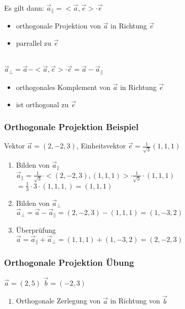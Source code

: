 \begin{frame}
    \vfill Es gilt dann:
    \vfill $\vec{a}_{\parallel} = < \vec{a}, \vec{e}> \cdot \vec{e}$ \\
    \begin{itemize}
        \item orthogonale Projektion von $\vec{a}$ in Richtung $\vec{e}$
        \item parrallel zu $\vec{e}$
    \end{itemize}
    \\
    \vfill$\vec{a}_{\perp} = \vec{a} - <\vec{a}, \vec{e}> \cdot \vec{e} = \vec{a} - \vec{a}_{\parallel}$
    \begin{itemize}
        \item orthogonales Komplement von $\vec{a}$ in Richtung $\vec{e}$
        \item ist orthogonal zu $\vec{e}$
    \end{itemize}
\end{frame}

\begin{frame}
    \frametitle{Orthogonale Projektion Beispiel}
    Vektor $\vec{a} = (2, -2, 3)$, Einheitsvektor $\vec{e} = \frac{1}{\sqrt{3}}(1, 1, 1)$\\

    \begin{enumerate}
        \item Bilden von $\vec{a}_{\parallel}$\\
        $\vec{a}_{\parallel} = \frac{1}{\sqrt{3}} \cdot <(2, -2, 3), (1, 1, 1)> \cdot \frac{1}{\sqrt{3}} \cdot (1, 1, 1)$
        $= \frac{1}{3} \cdot 3 \cdot (1, 1, 1,) = (1, 1, 1)$
        \item Bilden von $\vec{a}_{\perp}$\\
        $\vec{a}_{\perp} = \vec{a} - \vec{a}_{\parallel} = (2, -2, 3) - (1, 1, 1) = (1, -3 , 2)$
        \item Überprüfung\\
        $\vec{a} = \vec{a}_{\parallel} + \vec{a}_{\perp} = (1, 1, 1) + (1, -3, 2) = (2, -2, 3)$
    \end{enumerate}
\end{frame}


\begin{frame}
    \frametitle{Orthogonale Projektion Übung}
    $\vec{a} = (2, 5)$ $\vec{b} = (-2, 3)$\\
    \begin{enumerate}
        \item Orthogonale Zerlegung von $\vec{a}$ in Richtung von $\vec{b}$
    \end{enumerate}
\end{frame}


